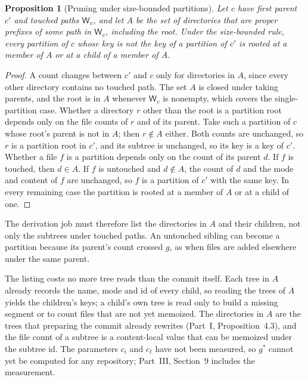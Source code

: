 \documentclass[11pt,letterpaper]{article}
\newtheorem{proposition}[theorem]{Proposition}
\theoremstyle{definition}
\theoremstyle{remark}
\newcommand{\W}{\mathsf{W}}
\begin{document}
\begin{proposition}[Pruning under size-bounded partitions]
\label{prop:pdd:recursive}
Let $c$ have first parent $c'$ and touched paths $\W_v$, and let $A$ be the set of directories that are proper prefixes of some path in $\W_v$, including the root. Under the size-bounded rule, every partition of $c$ whose key is not the key of a partition of $c'$ is rooted at a member of $A$ or at a child of a member of $A$.
\end{proposition}

\begin{proof}
A count changes between $c'$ and $c$ only for directories in $A$, since every other directory contains no touched path. The set $A$ is closed under taking parents, and the root is in $A$ whenever $\W_v$ is nonempty, which covers the single-partition case. Whether a directory $r$ other than the root is a partition root depends only on the file counts of $r$ and of its parent. Take such a partition of $c$ whose root's parent is not in $A$; then $r\notin A$ either. Both counts are unchanged, so $r$ is a partition root in $c'$, and its subtree is unchanged, so its key is a key of $c'$. Whether a file $f$ is a partition depends only on the count of its parent $d$. If $f$ is touched, then $d\in A$. If $f$ is untouched and $d\notin A$, the count of $d$ and the mode and content of $f$ are unchanged, so $f$ is a partition of $c'$ with the same key. In every remaining case the partition is rooted at a member of $A$ or at a child of one.
\end{proof}

The derivation job must therefore list the directories in $A$ and their children, not only the subtrees under touched paths. An untouched sibling can become a partition because its parent's count crossed $g$, as when files are added elsewhere under the same parent.

The listing costs no more tree reads than the commit itself. Each tree in $A$ already records the name, mode and id of every child, so reading the trees of $A$ yields the children's keys; a child's own tree is read only to build a missing segment or to count files that are not yet memoized. The directories in $A$ are the trees that preparing the commit already rewrites (Part~I, Proposition~4.3), and the file count of a subtree is a content-local value that can be memoized under the subtree id. The parameters $c_i$ and $c_\ell$ have not been measured, so $g^*$ cannot yet be computed for any repository; Part~III, Section~9 includes the measurement.
\end{document}
